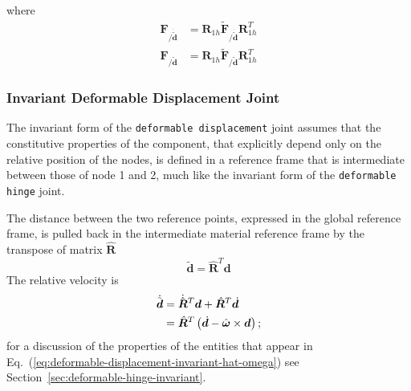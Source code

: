 \documentclass[10pt,dvips,fleqn,subeqn]{report}
\newcommand{\T}[1]{\bm{#1}}
\newcommand{\TT}[1]{\bm{#1}}
\begin{document}
where 
\begin{subequations}
\begin{align}
	\T{F}_{/\dot{\tilde{\T{d}}}} &= \T{R}_{1h} \tilde{\T{F}}_{/\dot{\tilde{\T{d}}}} \T{R}_{1h}^T \\
	\T{F}_{/\tilde{\T{d}}} &= \T{R}_{1h} \tilde{\T{F}}_{/\tilde{\T{d}}} \T{R}_{1h}^T
\end{align}
\end{subequations}



\subsubsection{Invariant Deformable Displacement Joint}
The invariant form of the \texttt{deformable displacement} joint
assumes that the constitutive properties of the component,
that explicitly depend only on the relative position 
of the nodes, is defined in a reference frame that is intermediate
between those of node 1 and 2, much like the invariant form
of the \texttt{deformable hinge} joint.

The distance between the two reference points, expressed
in the global reference frame, is pulled back in the 
intermediate material reference frame by the transpose
of matrix $\hat{\TT{R}}$
\begin{equation}
	\tilde{\T{d}} = \hat{\TT{R}}^T \T{d}
\end{equation}
The relative velocity is
\begin{align}
	\dot{\tilde{\T{d}}}
	&= \dot{\hat{\TT{R}}}^T \T{d} + \hat{\TT{R}}^T \dot{\T{d}}
		\nonumber \\
	&= \hat{\TT{R}}^T \plbr{
		\dot{\T{d}} - \hat{\T{\omega}} \times \T{d}
	} ;
\end{align}
for a discussion of the properties of the entities
that appear in Eq.~(\ref{eq:deformable-displacement-invariant-hat-omega})
see Section~\ref{sec:deformable-hinge-invariant}.
\end{document}
